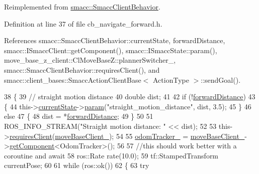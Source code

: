 Reimplemented from \hyperlink{classsmacc_1_1SmaccClientBehavior_a7962382f93987c720ad432fef55b123f}{smacc\+::\+Smacc\+Client\+Behavior}.



Definition at line 37 of file cb\+\_\+navigate\+\_\+forward.\+h.



References smacc\+::\+Smacc\+Client\+Behavior\+::current\+State, forward\+Distance, smacc\+::\+I\+Smacc\+Client\+::get\+Component(), smacc\+::\+I\+Smacc\+State\+::param(), move\+\_\+base\+\_\+z\+\_\+client\+::\+Cl\+Move\+Base\+Z\+::planner\+Switcher\+\_\+, smacc\+::\+Smacc\+Client\+Behavior\+::requires\+Client(), and smacc\+::client\+\_\+bases\+::\+Smacc\+Action\+Client\+Base$<$ Action\+Type $>$\+::send\+Goal().


\begin{DoxyCode}
38     \{
39         \textcolor{comment}{// straight motion distance}
40         \textcolor{keywordtype}{double} dist;
41 
42         \textcolor{keywordflow}{if} (!\hyperlink{classmove__base__z__client_1_1CbNavigateForward_ab3097d686b5a82b4f650bc5175d8ab73}{forwardDistance})
43         \{
44             this->\hyperlink{classsmacc_1_1SmaccClientBehavior_af76fc9b877542ed5caf033f820c107d0}{currentState}->\hyperlink{classsmacc_1_1ISmaccState_a4982f2187ed6da337462721146e8ef70}{param}(\textcolor{stringliteral}{"straight\_motion\_distance"}, dist, 3.5);
45         \}
46         \textcolor{keywordflow}{else}
47         \{
48             dist = *\hyperlink{classmove__base__z__client_1_1CbNavigateForward_ab3097d686b5a82b4f650bc5175d8ab73}{forwardDistance};
49         \}
50 
51         ROS\_INFO\_STREAM(\textcolor{stringliteral}{"Straight motion distance: "} << dist);
52 
53         this->\hyperlink{classsmacc_1_1SmaccClientBehavior_a917f001e763a1059af337bf4e164f542}{requiresClient}(\hyperlink{classmove__base__z__client_1_1CbNavigateForward_ab3b4592cd7f30b490a0549f2ee67c389}{moveBaseClient\_});
54 
55         \hyperlink{classmove__base__z__client_1_1CbNavigateForward_ae5573b288a966114a875d5b79a6c7924}{odomTracker\_} = \hyperlink{classmove__base__z__client_1_1CbNavigateForward_ab3b4592cd7f30b490a0549f2ee67c389}{moveBaseClient\_}->\hyperlink{classsmacc_1_1ISmaccClient_adef78db601749ca63c19e74a27cb88cc}{getComponent}<OdomTracker>();
56 
57         \textcolor{comment}{//this should work better with a coroutine and await}
58         ros::Rate rate(10.0);
59         tf::StampedTransform currentPose;
60 
61         \textcolor{keywordflow}{while} (ros::ok())
62         \{
63             \textcolor{keywordflow}{try}

\end{DoxyCode}
